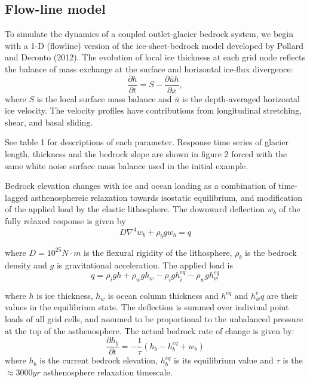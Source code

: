 \documentclass[tc, manuscript]{copernicus}
\begin{document}
\subsection{Flow-line model}
To simulate the dynamics of a coupled outlet-glacier bedrock system, we begin with a 1-D (flowline) version of the ice-sheet-bedrock model developed by Pollard and Deconto (2012). The evolution of local ice thickness at each grid node reflects the balance of mass exchange at the surface and horizontal ice-flux divergence: 
\begin{equation}
\frac{\partial h}{\partial t} = S - \frac{\partial \bar{u}h}{\partial x},
\end{equation}
where $S$ is the local surface mass balance and $\bar{u}$ is the depth-averaged horizontal ice velocity. The velocity profiles have contributions from longitudinal stretching, shear, and basal sliding.

See table 1 for descriptions of each parameter. 
Response time series of glacier length, thickness and the bedrock slope are shown in figure 2 forced with the same white noise surface mass balance used in the initial example.

Bedrock elevation changes with ice and ocean loading as a combination of time-lagged asthenosphereic relaxation towards isostatic equilibrium, and modification of the applied load by the elastic lithosphere. The downward deflection $w_b$ of the fully relaxed response is given by 
\begin{equation}
D\nabla^4 w_b + \rho_b g w_b = q
\end{equation}

where $D = 10^{25} N\cdot m$ is the flexural rigidity of the lithosphere, $\rho_b$ is the bedrock density and $g$ is gravitational acceleration. The applied load is 
\begin{equation}
q = \rho_i g h + \rho_w g h_w - \rho_i g h_i^{eq} - \rho_w g h_w^{eq} 
\end{equation}

where $h$ is ice thickness, $h_w$ is ocean column thickness and $h^{eq}$ and $h_w^eq$ are their values in the equilibrium state. The deflection is summed over indiviual point loads of all grid cells, and assumed to be proportional to the unbalanced pressure at the top of the asthenosphere. The actual bedrock rate of change is given by:
\begin{equation}
\frac{\partial h_b}{\partial t} = -\frac{1}{\tau} \left(h_b - h_b^{eq} + w_b \right)
\end{equation}
where $h_b$ is the current bedrock elevation, $h_b^{eq}$ is its equilibrium value and $\tau$ is the $\approx 3000yr$ asthenosphere relaxation timescale.
\end{document}

